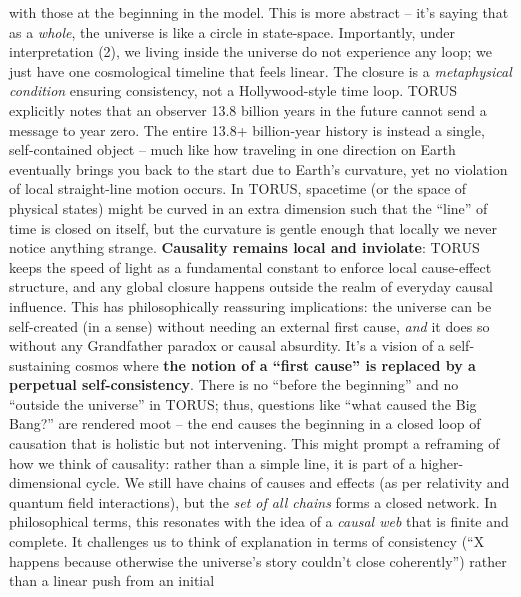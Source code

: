 \documentclass[
]{article}
\begin{document}
\begin{itemize}
  with those at the beginning in the model\hspace{0pt}. This is more
  abstract -- it's saying that as a \emph{whole}, the universe is like a
  circle in state-space. Importantly, under interpretation (2), we
  living inside the universe do not experience any loop; we just have
  one cosmological timeline that feels linear. The closure is a
  \emph{metaphysical condition} ensuring consistency, not a
  Hollywood-style time loop. TORUS explicitly notes that an observer
  13.8 billion years in the future cannot send a message to year
  zero\hspace{0pt}. The entire 13.8+ billion-year history is instead a
  single, self-contained object -- much like how traveling in one
  direction on Earth eventually brings you back to the start due to
  Earth's curvature, yet no violation of local straight-line motion
  occurs. In TORUS, spacetime (or the space of physical states) might be
  curved in an extra dimension such that the ``line'' of time is closed
  on itself, but the curvature is gentle enough that locally we never
  notice anything strange. \textbf{Causality remains local and
  inviolate}: TORUS keeps the speed of light as a fundamental constant
  to enforce local cause-effect structure\hspace{0pt}, and any global
  closure happens outside the realm of everyday causal influence. This
  has philosophically reassuring implications: the universe can be
  self-created (in a sense) without needing an external first cause,
  \emph{and} it does so without any Grandfather paradox or causal
  absurdity. It's a vision of a self-sustaining cosmos where \textbf{the
  notion of a ``first cause'' is replaced by a perpetual
  self-consistency}. There is no ``before the beginning'' and no
  ``outside the universe'' in TORUS\hspace{0pt}; thus, questions like
  ``what caused the Big Bang?'' are rendered moot -- the end causes the
  beginning in a closed loop of causation that is holistic but not
  intervening. This might prompt a reframing of how we think of
  causality: rather than a simple line, it is part of a
  higher-dimensional cycle. We still have chains of causes and effects
  (as per relativity and quantum field interactions), but the \emph{set
  of all chains} forms a closed network. In philosophical terms, this
  resonates with the idea of a \emph{causal web} that is finite and
  complete. It challenges us to think of explanation in terms of
  consistency (``X happens because otherwise the universe's story
  couldn't close coherently'') rather than a linear push from an initial

\end{itemize}
\end{document}
